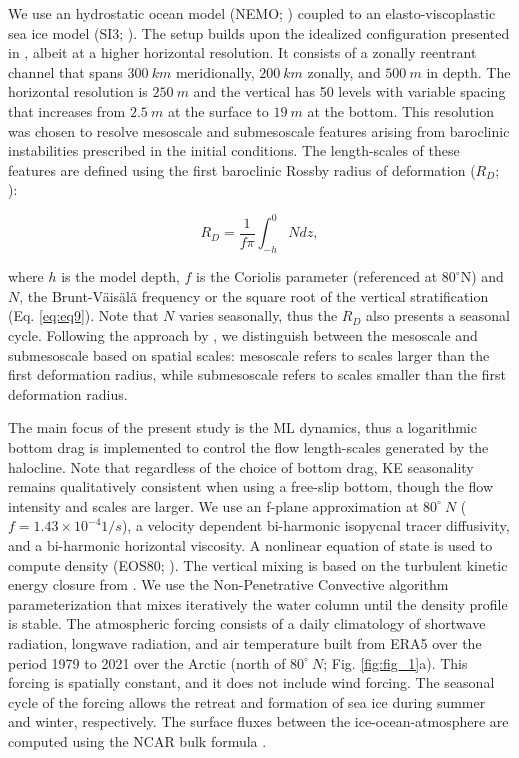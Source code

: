 \documentclass[draft]{agujournal2019}
\begin{document}
We use an hydrostatic ocean model (NEMO; \citealp*{NEMO_man}) coupled to an elasto-viscoplastic sea ice model (SI3; \citealp*{SI3_man}). The setup builds upon the idealized configuration presented in \citet{Martinez_eddies_ice_2025}, albeit at a higher horizontal resolution. It consists of a zonally reentrant channel that spans $300\ km$ meridionally, $200\ km$ zonally, and $500\ m$ in depth. The horizontal resolution is $250\ m$ and the vertical has 50 levels with variable spacing that increases from $2.5\ m$ at the surface to $19\ m$ at the bottom. This resolution was chosen to resolve mesoscale and submesoscale features arising from baroclinic instabilities prescribed in the initial conditions. The length-scales of these features are defined using the first baroclinic Rossby radius of deformation ($R_{D}$; \citealt{Chelton_geographical_1998}): 
\begin{linenomath*}
  \begin{equation}
    R_{D} = \frac{1}{f\pi} \int_{-h}^0 N dz,
  \end{equation}
\end{linenomath*}
where $h$ is the model depth, $f$ is the Coriolis parameter (referenced at $80^\circ$N) and $N$, the Brunt-V\"ais\"al\"a frequency or the square root of the vertical stratification (Eq. \ref{eq:eq9}). Note that $N$ varies seasonally, thus the $R_D$ also presents a seasonal cycle. Following the approach by \citet{Callies_submesoscale_2013}, we distinguish between the mesoscale and submesoscale based on spatial scales: mesoscale refers to scales larger than the first deformation radius, while submesoscale refers to scales smaller than the first deformation radius. 

The main focus of the present study is the ML dynamics, thus a logarithmic bottom drag is implemented to control the flow length-scales generated by the halocline. Note that regardless of the choice of bottom drag, KE seasonality remains qualitatively consistent when using a free-slip bottom, though the flow intensity and scales are larger.
We use an f-plane approximation at $80^\circ\ N$ ($f=1.43\times 10^{-4} 1/s$), a velocity dependent bi-harmonic isopycnal tracer diffusivity, and a bi-harmonic horizontal viscosity. A nonlinear equation of state is used to compute density (EOS80; \citealt{EOS_80}). 
The vertical mixing is based on the turbulent kinetic energy closure from \citet{blanke_TKE_1993}. We use the Non-Penetrative Convective algorithm parameterization that mixes iteratively the water column until the density profile is stable. 
The atmospheric forcing consists of a daily climatology of shortwave radiation, longwave radiation, and air temperature built from ERA5 over the period 1979 to 2021 over the Arctic (north of $80^\circ\ N$; Fig. \ref{fig:fig_1}a). This forcing is spatially constant, and it does not include wind forcing. The seasonal cycle of the forcing allows the retreat and formation of sea ice during summer and winter, respectively. The surface fluxes between the ice-ocean-atmosphere are computed using the NCAR bulk formula \citep{Large_NCAR_2009}.
\end{document}
